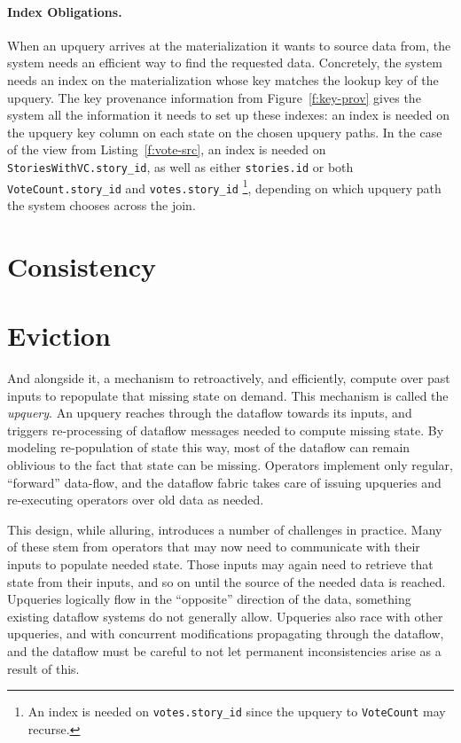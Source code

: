 \paragraph{Index Obligations.}
When an upquery arrives at the materialization it wants to source data from, the
system needs an efficient way to find the requested data. Concretely, the system
needs an index on the materialization whose key matches the lookup key of the
upquery. The key provenance information from Figure~\ref{f:key-prov} gives the
system all the information it needs to set up these indexes: an index is needed
on the upquery key column on each state on the chosen upquery paths. In the case
of the view from Listing~\ref{f:vote-src}, an index is needed on
\texttt{StoriesWithVC.story\_id}, as well as either \texttt{stories.id} or
both \texttt{VoteCount.story\_id} and \texttt{votes.story\_id}%
\footnote{An index is needed on \texttt{votes.story\_id} since the upquery to
\texttt{VoteCount} may recurse.}, depending on which upquery path the system
chooses across the join.

\section{Consistency}

\section{Eviction}

And
alongside it, a mechanism to retroactively, and efficiently, compute over past
inputs to repopulate that missing state on demand. This mechanism is called the \emph{upquery}. An upquery reaches through the
dataflow towards its inputs, and triggers re-processing of dataflow messages
needed to compute missing state. By modeling re-population of state this way,
most of the dataflow can remain oblivious to the fact that state can be missing.
Operators implement only regular, ``forward'' data-flow, and the dataflow fabric
takes care of issuing upqueries and re-executing operators over old data as
needed.

This design, while alluring, introduces a number of challenges in practice. Many
of these stem from operators that may now need to communicate with their inputs
to populate needed state. Those inputs may again need to retrieve that state
from their inputs, and so on until the source of the needed data is reached.
Upqueries logically flow in the ``opposite'' direction of the data, something
existing dataflow systems do not generally allow. Upqueries also race with other
upqueries, and with concurrent modifications propagating through the dataflow,
and the dataflow must be careful to not let permanent inconsistencies arise as a
result of this.

